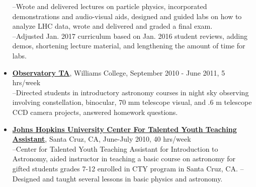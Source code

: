\begin{itemize}
{--Wrote and delivered lectures on particle physics, incorporated demonstrations and audio-visual aids, designed and guided labs on how to analyze LHC data, wrote and delivered and graded a final exam.\\ 
--Adjusted Jan. 2017 curriculum based on Jan. 2016 student reviews, adding demos, shortening lecture material, and lengthening the amount of time for labs.\\}
\item{\href{http://astronomy.williams.edu}{\textbf{Observatory TA}}, Williams College, September 2010 - June 2011, 5 hrs/week\\
--Directed students in introductory astronomy courses in night sky observing involving constellation, binocular, 70 mm telescope visual, and .6 m telescope CCD camera projects, answered homework questions.}
\item{\href{http://cty.jhu.edu/index.html}{\textbf{Johns Hopkins University Center For Talented Youth Teaching Assistant}}, Santa Cruz, CA, June-July 2010, 40 hrs/week\\
--Center for Talented Youth Teaching Assistant for Introduction to Astronomy, aided instructor in teaching a basic course on astronomy for gifted students grades 7-12 enrolled in CTY program in Santa Cruz, CA. 
--Designed and taught several lessons in basic physics and astronomy.}
\end{itemize}

 

